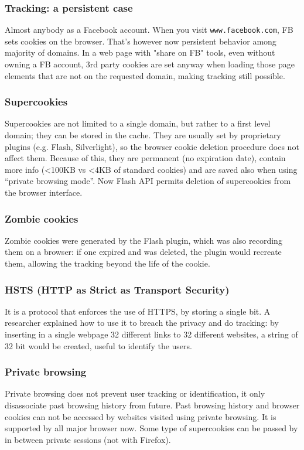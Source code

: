 \documentclass[a4paper, 10pt, titlepage]{article}
\begin{document}
\subsubsection*{Tracking: a persistent case}
Almost anybody as a Facebook account. When you visit \lstinline|www.facebook.com|, FB sets cookies on the browser. That’s however now persistent behavior among majority of domains. In a web page with "share on FB" tools, even without owning a FB account, 3rd party cookies are set anyway when loading those page elements that are not on the requested domain, making tracking still possible.

\subsubsection*{Supercookies}
Supercookies are not limited to a single domain, but rather to a first level domain; they can be stored in the cache. They are usually set by proprietary plugins (e.g. Flash, Silverlight), so the browser cookie deletion procedure does not affect them. Because of this, they are permanent (no expiration date), contain more info (<100KB vs <4KB of standard cookies) and are saved also when using “private browsing mode”. Now Flash API permits deletion of supercookies from the browser interface.

\subsubsection*{Zombie cookies}
Zombie cookies were generated by the Flash plugin, which was also recording them on a browser: if one expired and was deleted, the plugin would recreate them, allowing the tracking beyond the life of the cookie. 

\subsubsection*{HSTS (HTTP as Strict as Transport Security)}
It is a protocol that enforces the use of HTTPS, by storing a single bit. A researcher explained how to use it to breach the privacy and do tracking: by inserting in a single webpage 32 different links to 32 different websites, a string of 32 bit would be created, useful to identify the users.

\subsubsection*{Private browsing}
Private browsing does not prevent user tracking or identification, it only disassociate past browsing history from future. Past browsing history and browser cookies can not be accessed by websites visited using private browsing. It is supported by all major browser now. Some type of supercookies can be passed by in between private sessions (not with Firefox). 
\end{document}
